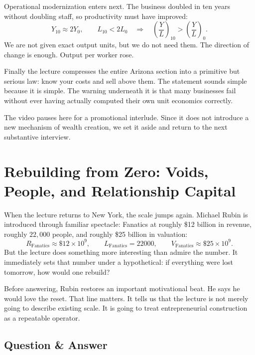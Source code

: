 Operational modernization enters next. The business doubled in ten years without doubling staff, so productivity must have improved:
\begin{equation}
Y_{10}\approx 2Y_0,\qquad L_{10}<2L_0
\quad\Longrightarrow\quad
\left(\frac{Y}{L}\right)_{10}>\left(\frac{Y}{L}\right)_0.
\end{equation}
We are not given exact output units, but we do not need them. The direction of change is enough. Output per worker rose.

Finally the lecture compresses the entire Arizona section into a primitive but serious law: know your costs and sell above them. The statement sounds simple because it is simple. The warning underneath it is that many businesses fail without ever having actually computed their own unit economics correctly.

\begin{remark}
The video pauses here for a promotional interlude. Since it does not introduce a new mechanism of wealth creation, we set it aside and return to the next substantive interview.
\end{remark}

\section{Rebuilding from Zero: Voids, People, and Relationship Capital}

When the lecture returns to New York, the scale jumps again. Michael Rubin is introduced through familiar spectacle: Fanatics at roughly \$12 billion in revenue, roughly \(22{,}000\) people, and roughly \$25 billion in valuation:
\begin{equation}
R_{\mathrm{Fanatics}}\approx \$12\times 10^9,\qquad
L_{\mathrm{Fanatics}}=22000,\qquad
V_{\mathrm{Fanatics}}\approx \$25\times 10^9.
\end{equation}
But the lecture does something more interesting than admire the number. It immediately sets that number under a hypothetical: if everything were lost tomorrow, how would one rebuild?

Before answering, Rubin restores an important motivational beat. He says he would love the reset. That line matters. It tells us that the lecture is not merely going to describe existing scale. It is going to treat entrepreneurial construction as a repeatable operator.

\subsection{Question \& Answer}

